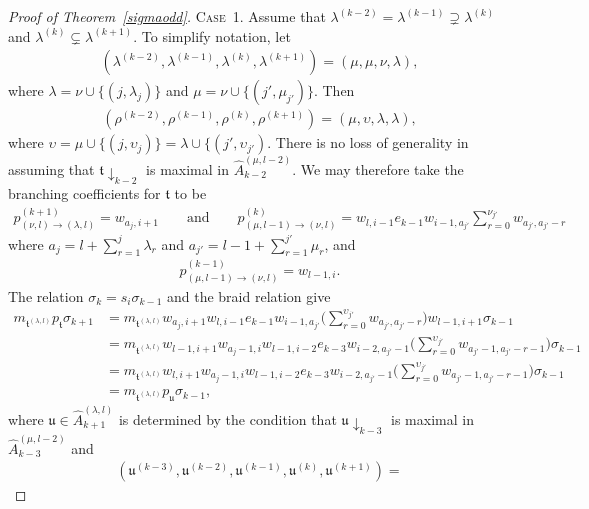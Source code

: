 \documentclass[11pt,a4paper,reqno,svgnames]{amsart}
\theoremstyle{plain}
\theoremstyle{definition}
\numberwithin{equation}{section}
\begin{document}
\begin{proof}[Proof of Theorem~\ref{sigmaodd}]
{\textsc{Case~1.}} Assume that $\lambda^{(k-2)}=\lambda^{(k-1)}\supsetneq\lambda^{(k)}$ and $\lambda^{(k)}\subsetneq \lambda^{(k+1)}$. To simplify notation, let
\begin{align*}
(\lambda^{(k-2)},\lambda^{(k-1)},\lambda^{(k)},\lambda^{(k+1)})=(\mu,\mu,\nu,\lambda),
\end{align*}
where $\lambda=\nu\cup{\lbrace}(j,\lambda_j){\rbrace}$ and $\mu=\nu\cup{\lbrace}(j',\mu_{j'}){\rbrace}$. Then 
\begin{align*}
(\rho^{(k-2)},\rho^{(k-1)},\rho^{(k)},\rho^{(k+1)})=(\mu,\upsilon,\lambda,\lambda), 
\end{align*}
where $\upsilon=\mu\cup{\lbrace}(j,\upsilon_j) {\rbrace}=\lambda\cup{\lbrace}(j',\upsilon_{j'})$. There is no loss of generality in assuming that $\mathfrak{t}\downarrow_{k-2}$ is maximal in $\hat{A}_{k-2}^{(\mu,l-2)}$. We may therefore take the branching coefficients for $\mathfrak{t}$ to be
\begin{align*}
p_{(\nu,l)\to(\lambda,l)}^{(k+1)}=w_{a_j,i+1} \qquad\text{and}\qquad p_{(\mu,l-1)\to(\nu,l)}^{(k)}=w_{l,i-1}e_{k-1}w_{i-1,a_{j'}}
\sum_{r=0}^{\nu_{j'}} w_{a_{j'},a_{j'}-r}
\end{align*}
where $a_j= l +\sum_{r=1}^j\lambda_r$ and $a_{j'}= l -1+\sum_{r=1}^{j'}\mu_r$, and
\begin{align*}
p_{(\mu,l-1)\to(\nu,l)}^{(k-1)}=w_{l-1,i}. 
\end{align*}
The relation $\sigma_{k}=s_{i}\sigma_{k-1}$ and the braid relation give
\begin{align*}
m_{\mathfrak{t}^{(\lambda,l)}}p_\mathfrak{t}\sigma_{k+1}
&=m_{\mathfrak{t}^{(\lambda,l)}} w_{a_j,i+1}w_{l,i-1}e_{k-1}w_{i-1,a_{j'}}
\bigg(\sum_{r=0}^{\upsilon_{j'}} w_{a_{j'},a_{j'}-r}\bigg)w_{l-1,i+1}\sigma_{k-1}\\
&=m_{\mathfrak{t}^{(\lambda,l)}} w_{l-1,i+1}w_{a_j-1,i}w_{l-1,i-2}e_{k-3}w_{i-2,a_{j'}-1}
\bigg(\sum_{r=0}^{\upsilon_{j'}} w_{a_{j'}-1,a_{j'}-r-1}\bigg)\sigma_{k-1}\\
&=m_{\mathfrak{t}^{(\lambda,l)}} w_{l,i+1}w_{a_j-1,i}w_{l-1,i-2}e_{k-3}w_{i-2,a_{j'}-1}
\bigg(\sum_{r=0}^{\upsilon_{j'}} w_{a_{j'}-1,a_{j'}-r-1}\bigg)\sigma_{k-1}\\
&=m_{\mathfrak{t}^{(\lambda,l)}} p_\mathfrak{u}\sigma_{k-1},
\end{align*}
where 
$\mathfrak{u}\in\hat{A}_{k+1}^{(\lambda,l)}$ is determined by the condition that $\mathfrak{u}\downarrow_{k-3}$ is maximal in $\hat{A}_{k-3}^{(\mu,l-2)}$ and 
\begin{align*}
(\mathfrak{u}^{(k-3)},\mathfrak{u}^{(k-2)},\mathfrak{u}^{(k-1)},\mathfrak{u}^{(k)},\mathfrak{u}^{(k+1)})=

\end{align*}
\end{proof}
\end{document}
